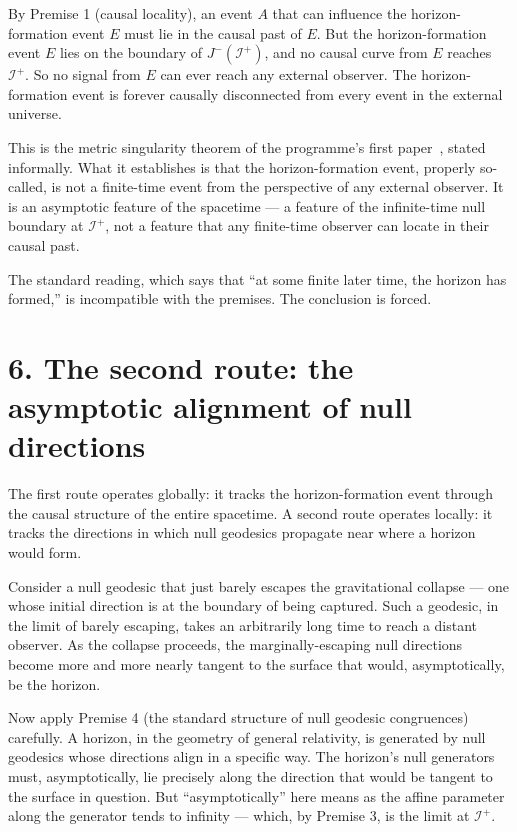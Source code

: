 \documentclass[11pt,a4paper]{article}
\begin{document}
By Premise 1 (causal locality), an event $A$ that can influence the horizon-formation event $E$ must lie in the causal past of $E$. But the horizon-formation event $E$ lies on the boundary of $J^-(\mathscr{I}^+)$, and no causal curve from $E$ reaches $\mathscr{I}^+$. So no signal from $E$ can ever reach any external observer. The horizon-formation event is forever causally disconnected from every event in the external universe.

This is the metric singularity theorem of the programme's first paper~\cite{JanzenBHcausality}, stated informally. What it establishes is that the horizon-formation event, properly so-called, is not a finite-time event from the perspective of any external observer. It is an asymptotic feature of the spacetime --- a feature of the infinite-time null boundary at $\mathscr{I}^+$, not a feature that any finite-time observer can locate in their causal past.

The standard reading, which says that ``at some finite later time, the horizon has formed,'' is incompatible with the premises. The conclusion is forced.

\section*{6. The second route: the asymptotic alignment of null directions}

The first route operates globally: it tracks the horizon-formation event through the causal structure of the entire spacetime. A second route operates locally: it tracks the directions in which null geodesics propagate near where a horizon would form.

Consider a null geodesic that just barely escapes the gravitational collapse --- one whose initial direction is at the boundary of being captured. Such a geodesic, in the limit of barely escaping, takes an arbitrarily long time to reach a distant observer. As the collapse proceeds, the marginally-escaping null directions become more and more nearly tangent to the surface that would, asymptotically, be the horizon.

Now apply Premise 4 (the standard structure of null geodesic congruences) carefully. A horizon, in the geometry of general relativity, is generated by null geodesics whose directions align in a specific way. The horizon's null generators must, asymptotically, lie precisely along the direction that would be tangent to the surface in question. But ``asymptotically'' here means as the affine parameter along the generator tends to infinity --- which, by Premise 3, is the limit at $\mathscr{I}^+$.
\end{document}
